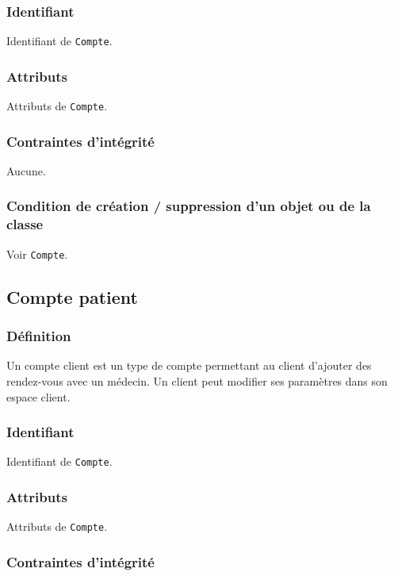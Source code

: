 \subsubsection{Identifiant}

Identifiant de \texttt{Compte}.

\subsubsection{Attributs}

Attributs de \texttt{Compte}.

\subsubsection{Contraintes d'intégrité}

Aucune.

\subsubsection{Condition de création / suppression d'un objet ou de la classe}

Voir \texttt{Compte}.

\subsection{Compte patient}

\subsubsection{Définition}

Un compte client est un type de compte permettant au client d'ajouter des rendez-vous avec un médecin.
Un client peut modifier ses paramètres dans son espace client.

\subsubsection{Identifiant}

Identifiant de \texttt{Compte}.

\subsubsection{Attributs}

Attributs de \texttt{Compte}.

\subsubsection{Contraintes d'intégrité}

